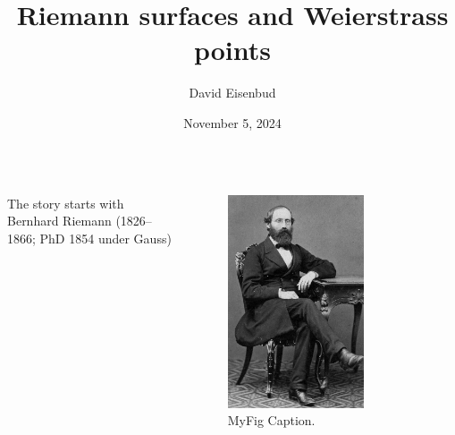 \documentclass[12pt, aspectratio=169]{beamer}
\title{Riemann surfaces and Weierstrass points}
\author{David Eisenbud}
\date{November 5, 2024}
\begin{document}
\maketitle


\begin{frame}{}
\begin{columns}
 The story starts with \alert{Bernhard Riemann} (1826--1866; PhD 1854 under Gauss)
\begin{figure}
    \centering
    \includegraphics[width=0.7\textwidth]{"Bernhard-Riemann.jpg"}
    \caption{\label{fig:Riemann}MyFig Caption.}
\end{figure}
\end{columns}
 \end{frame}
\end{document}
